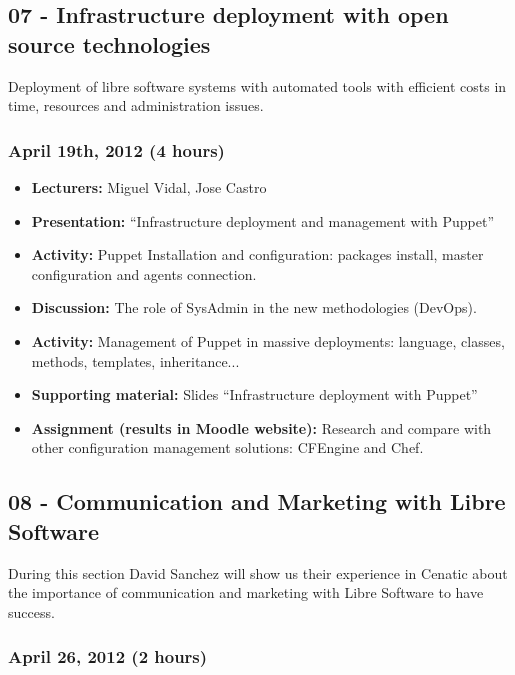 \documentclass[a4paper]{article}
\begin{document}
\subsection{07 - Infrastructure deployment with open source technologies}

Deployment of libre software systems with automated tools with efficient costs in time, resources and administration issues.

\subsubsection{April 19th, 2012 (4 hours)}


\begin{itemize}
\item \textbf{Lecturers:} Miguel Vidal, Jose Castro
\item \textbf{Presentation:} ``Infrastructure deployment and management with Puppet''
\item \textbf{Activity:} Puppet Installation and configuration: packages install, master configuration and agents connection.
\item \textbf{Discussion:} The role of SysAdmin in the new methodologies (DevOps).
\item \textbf{Activity:} Management of Puppet in massive deployments: language, classes, methods, templates, inheritance...
\item \textbf{Supporting material:} Slides ``Infrastructure deployment with Puppet''
\item \textbf{Assignment (results in Moodle website):} Research and compare with other configuration management solutions: CFEngine and Chef.
\end{itemize}



\subsection{08 - Communication and Marketing with Libre Software}

During this section David Sanchez will show us their experience in Cenatic about the importance of communication and marketing with Libre Software to have success. 

\subsubsection{April 26, 2012 (2 hours)}
\end{document}
